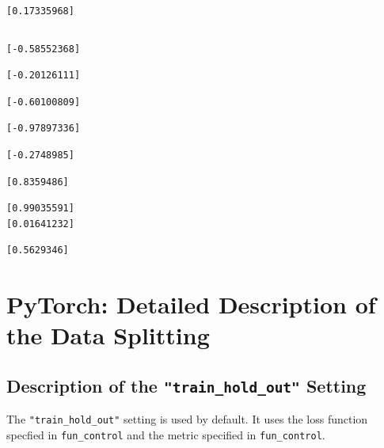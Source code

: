 \documentclass[
  letterpaper,
  DIV=11,
  numbers=noendperiod]{scrreprt}
\begin{document}
\begin{verbatim}
[0.17335968]
\end{verbatim}

\begin{verbatim}
\end{verbatim}

\begin{verbatim}
[-0.58552368]
\end{verbatim}

\begin{verbatim}
[-0.20126111]
\end{verbatim}

\begin{verbatim}
[-0.60100809]
\end{verbatim}

\begin{verbatim}
[-0.97897336]
\end{verbatim}

\begin{verbatim}
[-0.2748985]
\end{verbatim}

\begin{verbatim}
[0.8359486]
\end{verbatim}

\begin{verbatim}
[0.99035591]
[0.01641232]
\end{verbatim}

\begin{verbatim}
[0.5629346]
\end{verbatim}

\newpage{}

\hypertarget{sec-detailed-data-splitting}{%
\section{PyTorch: Detailed Description of the Data
Splitting}\label{sec-detailed-data-splitting}}

\hypertarget{description-of-the-train_hold_out-setting}{%
\subsection{\texorpdfstring{Description of the
\texttt{"train\_hold\_out"}
Setting}{Description of the "train\_hold\_out" Setting}}\label{description-of-the-train_hold_out-setting}}

The \texttt{"train\_hold\_out"} setting is used by default. It uses the
loss function specfied in \texttt{fun\_control} and the metric specified
in \texttt{fun\_control}.
\end{document}
